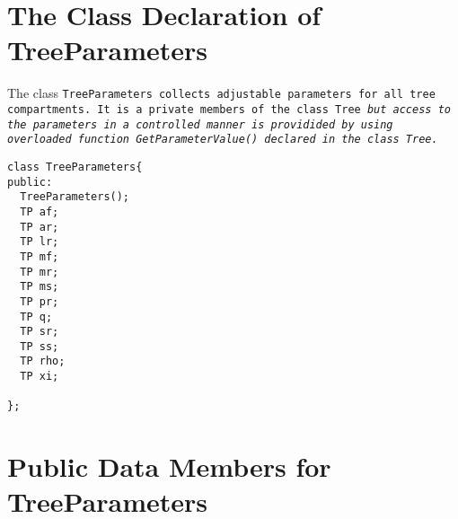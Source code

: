 \section{The Class Declaration of TreeParameters}

The class \tt TreeParameters \rm collects adjustable parameters for
all tree compartments. It is a private members of the class \tt Tree
\it but access to the parameters in a controlled manner is providided
by using overloaded function \tt GetParameterValue() \rm declared in
the class \tt Tree\rm.

\begin{verbatim}
class TreeParameters{
public:
  TreeParameters();
  TP af;            
  TP ar;            
  TP lr;            
  TP mf;            
  TP mr;            
  TP ms;            
  TP pr;            
  TP q;             
  TP sr;           
  TP ss;            
  TP rho;          
  TP xi;            

};
\end{verbatim}

\section{Public Data Members for TreeParameters}

